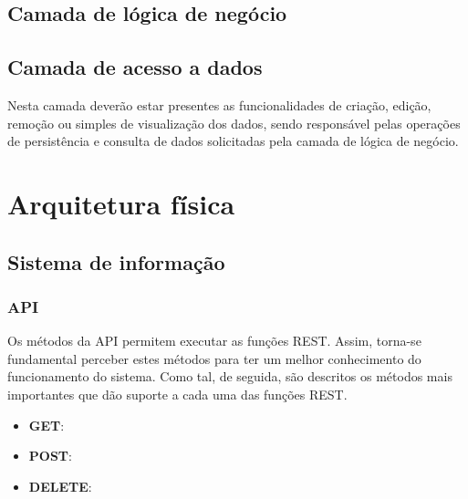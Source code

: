 \subsection{Camada de lógica de negócio}



\subsection{Camada de acesso a dados}


Nesta camada deverão estar presentes as funcionalidades de criação, edição, remoção ou simples de visualização dos dados, sendo responsável pelas operações
de persistência e consulta de dados solicitadas pela camada de lógica de negócio.



\section{Arquitetura física}


\subsection{Sistema de informação}



\subsubsection{\ac{API}}

Os métodos da API permitem executar as funções REST. Assim, torna-se fundamental perceber estes métodos para ter um melhor conhecimento do funcionamento do sistema. Como tal, de seguida, são descritos os métodos mais importantes que dão suporte a cada uma das funções REST.

\begin{itemize}
	\item \textbf{GET}: 
	\item \textbf{POST}: 
	\item \textbf{DELETE}: 
\end{itemize}





